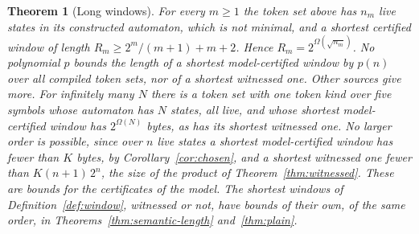 \documentclass[11pt,a4paper]{article}
\theoremstyle{definition}
\theoremstyle{plain}
\newtheorem{theorem}{Theorem}
\begin{document}
\begin{theorem}[Long windows]
\label{thm:long}
For every $m \geq 1$ the token set above has $n_m$ live states in its constructed automaton, which is not minimal, and a
shortest certified window of length $R_m \geq 2^m / (m + 1) + m + 2$. Hence $R_m = 2^{\Omega(\sqrt{n_m})}$. No
polynomial $p$ bounds the length of a shortest model-certified window by $p(n)$ over all compiled token sets, nor of a
shortest witnessed one. Other sources give more. For infinitely many $N$ there is a token set with one token kind over
five symbols whose automaton has $N$ states, all live, and whose shortest model-certified window has $2^{\Omega(N)}$
bytes, as has its shortest witnessed one. No larger order is possible, since over $n$ live states a shortest
model-certified window has fewer than $K$ bytes, by Corollary~\ref{cor:chosen}, and a shortest witnessed one fewer than
$K (n + 1)\, 2^n$, the size of the product of Theorem~\ref{thm:witnessed}. These are bounds for the certificates of the
model. The shortest windows of Definition~\ref{def:window}, witnessed or not, have bounds of their own, of the same
order, in Theorems~\ref{thm:semantic-length} and~\ref{thm:plain}.
\end{theorem}
\end{document}
